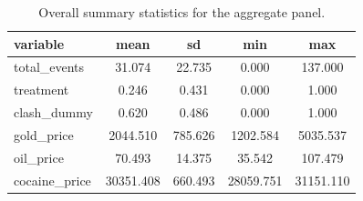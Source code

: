 \begin{table}[ht]
\centering
\caption{Overall summary statistics for the aggregate panel.}
\label{tab:summary_all}
\begin{tabular}{l c c c c}
\hline
variable & mean & sd & min & max \\
\hline
total\_events & 31.074 & 22.735 & 0.000 & 137.000 \\
treatment & 0.246 & 0.431 & 0.000 & 1.000 \\
clash\_dummy & 0.620 & 0.486 & 0.000 & 1.000 \\
gold\_price & 2044.510 & 785.626 & 1202.584 & 5035.537 \\
oil\_price & 70.493 & 14.375 & 35.542 & 107.479 \\
cocaine\_price & 30351.408 & 660.493 & 28059.751 & 31151.110 \\
\hline
\end{tabular}
\end{table}
